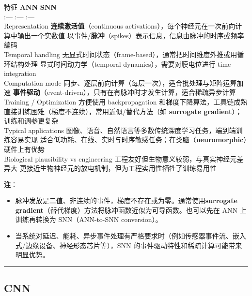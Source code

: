 特征 \textbar{} \textbf{ANN} \textbar{} \textbf{SNN} \textbar{}\\
:--- \textbar{} :--- \textbar{} :--- \textbar{}\\
Representation \textbar{} \textbf{连续激活值}（continuous
activations），每个神经元在一次前向计算中输出一个实数值 \textbar{}
以事件/\textbf{脉冲}（spikes）表示信息，信息由脉冲的时序或频率编码
\textbar{}\\
Temporal handling \textbar{}
无显式时间状态（frame-based），通常把时间维度外推或用循环结构处理
\textbar{} 显式时间动力学（temporal dynamics），需要对膜电位进行 time
integration \textbar{}\\
Computation mode \textbar{}
同步、逐层前向计算（每层一次），适合批处理与矩阵运算加速 \textbar{}
\textbf{事件驱动}（event-driven），只有在有脉冲时才发生计算，适合稀疏异步计算
\textbar{}\\
Training / Optimization \textbar{} 方便使用 backpropagation
和梯度下降算法，工具链成熟 \textbar{}
直接训练困难（梯度不连续），常用近似/替代方法（如 \textbf{surrogate
gradient}）；训练和调参更复杂 \textbar{}\\
Typical applications \textbar{}
图像、语音、自然语言等多数传统深度学习任务，端到端训练容易实现
\textbar{}
适合低功耗、在线、实时与时序敏感任务；在类脑（\textbf{neuromorphic}）硬件上有优势
\textbar{}\\
Biological plausibility vs engineering \textbar{}
工程友好但生物意义较弱，与真实神经元差异大 \textbar{}
更接近生物神经元的放电机制，但为工程实用性牺牲了训练易用性 \textbar{}

\textbf{注}：

\begin{itemize}
\tightlist
\item
  脉冲发放是二值、非连续的事件，梯度不存在或为零。通常使用\textbf{surrogate
  gradient}（替代梯度）方法将脉冲函数近似为可导函数。也可以先在 ANN
  上训练再转换为 SNN（ANN-to-SNN conversion）。
\item
  当系统对延迟、能耗、异步事件处理有严格要求时（例如传感器事件流、嵌入式/边缘设备、神经形态芯片等），SNN
  的事件驱动特性和稀疏计算可能带来明显优势。
\end{itemize}

\begin{center}\rule{0.5\linewidth}{0.5pt}\end{center}

\subsection{CNN}\label{cnn}

